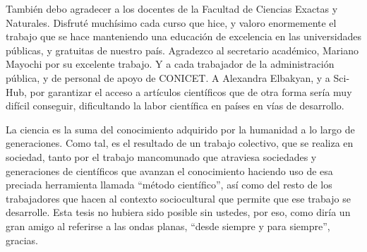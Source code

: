 También debo agradecer a los docentes de la Facultad de Ciencias Exactas y Naturales. 
Disfruté muchísimo cada curso que hice, y valoro enormemente el trabajo 
que se hace manteniendo una educación de excelencia en las universidades públicas, 
y gratuitas de nuestro país.
Agradezco al secretario académico, 
Mariano Mayochi por su excelente trabajo. 
Y a cada trabajador de la administración pública, y de personal de apoyo de 
CONICET. A Alexandra Elbakyan, y a Sci-Hub, por garantizar el acceso 
a artículos científicos que de otra forma sería muy difícil conseguir, 
dificultando la labor científica en países en vías de desarrollo.

La ciencia es la suma del conocimiento adquirido por la humanidad 
a lo largo de generaciones. Como tal, es el resultado de un trabajo colectivo, 
que se realiza en sociedad, tanto por el trabajo mancomunado 
que atraviesa sociedades y generaciones de científicos 
que avanzan el conocimiento haciendo uso 
de esa preciada herramienta llamada ``método científico'', 
así como del resto de los trabajadores que hacen al contexto sociocultural 
que permite que ese trabajo se 
desarrolle. Esta tesis no hubiera sido posible sin ustedes, 
por eso, como diría un gran amigo al referirse 
a las ondas planas, ``desde siempre y para siempre'', gracias.
